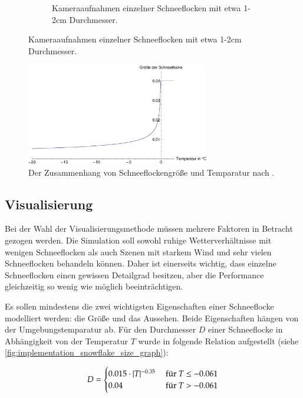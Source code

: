 \begin{figure}
\begin{subfigure}[b]{0.5\textwidth}
            \caption{Kameraaufnahmen einzelner Schneeflocken mit etwa 1-2cm Durchmesser\cite{Hanesch1966}.}
            \label{fig:implementation_real_snowflakes}
    \end{subfigure}
\end{figure}

\begin{figure}[ht]
\centering
\includegraphics[width=8cm]{images/snowflake_size_graph}
\caption{Der Zusammenhang von Schneeflockengröße und Temparatur nach \cite{Jun00}.}
\label{fig:implementation_snowflake_size_graph}
\end{figure}

\subsection{Visualisierung}

Bei der Wahl der Visualisierungsmethode müssen mehrere Faktoren in
Betracht gezogen werden. Die Simulation soll sowohl ruhige
Wetterverhältnisse mit wenigen Schneeflocken als auch Szenen mit
starkem Wind und sehr vielen Schneeflocken behandeln können. Daher ist
einerseits wichtig, dass einzelne Schneeflocken einen gewissen
Detailgrad besitzen, aber die Performance gleichzeitig so wenig wie
möglich beeinträchtigen.

Es sollen mindestens die zwei wichtigsten Eigenschaften einer
Schneeflocke modelliert werden: die Größe und das Aussehen. Beide
Eigenschaften hängen von der Umgebungstemparatur ab. Für den Durchmesser $D$
einer Schneeflocke in Abhängigkeit von der Temperatur $T$ wurde in
\cite{Jun00} folgende Relation aufgestellt (siehe
\autoref{fig:implementation_snowflake_size_graph}):

\begin{equation}
\label{eq:implementation_snowflake_diameter}
D =
\begin{cases}
0.015 \cdot |T|^{-0.35} & \textnormal{ für }T \leq -0.061 \\
0.04 & \textnormal{ für }T > -0.061
\end{cases}
\end{equation}

